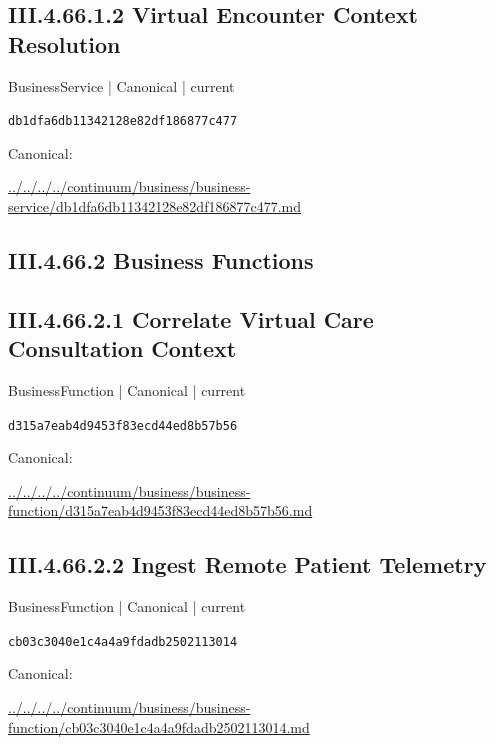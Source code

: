 \documentclass[10pt,a4paper]{article}
\begin{document}
\subsection*{III.4.66.1.2 Virtual Encounter Context Resolution}
{\small BusinessService | Canonical | current}\par
\texttt{db1dfa6db11342128e82df186877c477}\par
Canonical: \par
{\footnotesize\url{../../../../continuum/business/business-service/db1dfa6db11342128e82df186877c477.md}}\par
\subsection*{III.4.66.2 Business Functions}
\subsection*{III.4.66.2.1 Correlate Virtual Care Consultation Context}
{\small BusinessFunction | Canonical | current}\par
\texttt{d315a7eab4d9453f83ecd44ed8b57b56}\par
Canonical: \par
{\footnotesize\url{../../../../continuum/business/business-function/d315a7eab4d9453f83ecd44ed8b57b56.md}}\par
\subsection*{III.4.66.2.2 Ingest Remote Patient Telemetry}
{\small BusinessFunction | Canonical | current}\par
\texttt{cb03c3040e1c4a4a9fdadb2502113014}\par
Canonical: \par
{\footnotesize\url{../../../../continuum/business/business-function/cb03c3040e1c4a4a9fdadb2502113014.md}}\par
\end{document}
